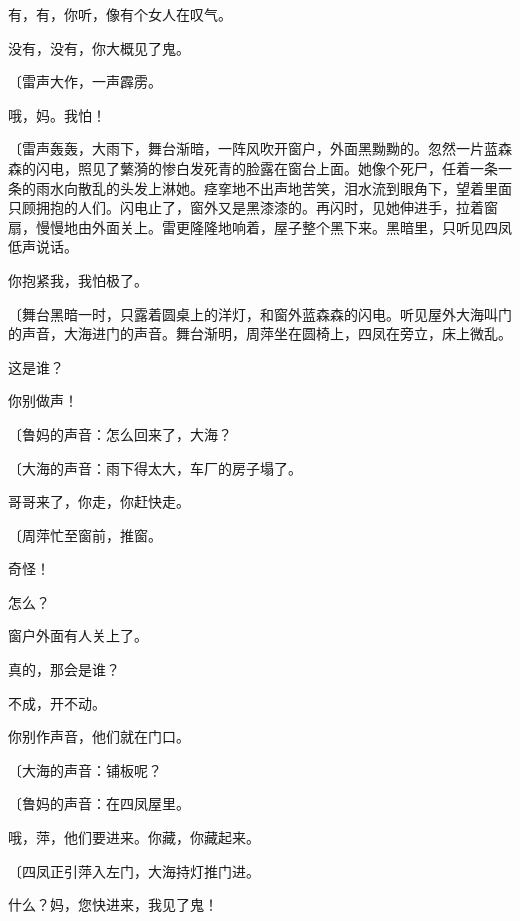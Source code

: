 有，有，你听，像有个女人在叹气。

没有，没有，你大概见了鬼。

{\fangsong〔雷声大作，一声霹雳。}

哦，妈。我怕！

{\fangsong〔雷声轰轰，大雨下，舞台渐暗，一阵风吹开窗户，外面黑黝黝的。忽然一片蓝森森的闪电，照见了蘩漪的惨白发死青的脸露在窗台上面。她像个死尸，任着一条一条的雨水向散乱的头发上淋她。痉挛地不出声地苦笑，泪水流到眼角下，望着里面只顾拥抱的人们。闪电止了，窗外又是黑漆漆的。再闪时，见她伸进手，拉着窗扇，慢慢地由外面关上。雷更隆隆地响着，屋子整个黑下来。黑暗里，只听见四凤低声说话。}

你抱紧我，我怕极了。

{\fangsong〔舞台黑暗一时，只露着圆桌上的洋灯，和窗外蓝森森的闪电。听见屋外大海叫门的声音，大海进门的声音。舞台渐明，周萍坐在圆椅上，四凤在旁立，床上微乱。}

这是谁？

你别做声！

{\fangsong〔鲁妈的声音：怎么回来了，大海？}

{\fangsong〔大海的声音：雨下得太大，车厂的房子塌了。}

哥哥来了，你走，你赶快走。

{\fangsong〔周萍忙至窗前，推窗。}

奇怪！

怎么？

窗户外面有人关上了。

真的，那会是谁？

不成，开不动。

你别作声音，他们就在门口。

{\fangsong〔大海的声音：铺板呢？}

{\fangsong〔鲁妈的声音：在四凤屋里。}

哦，萍，他们要进来。你藏，你藏起来。

{\fangsong〔四凤正引萍入左门，大海持灯推门进。}

什么？妈，您快进来，我见了鬼！

